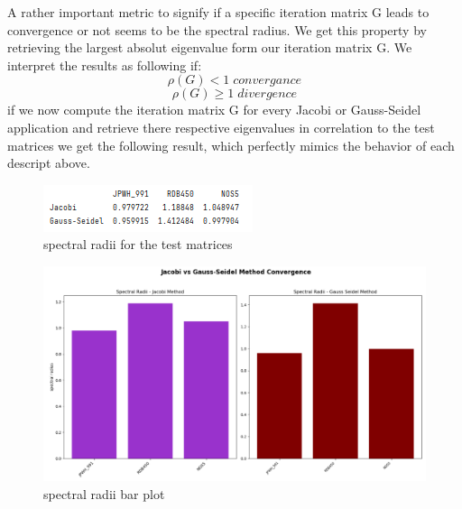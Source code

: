 \documentclass{article}
\begin{document}
A rather important metric to signify if a specific iteration matrix G leads to convergence or not seems to be the spectral radius. We get this property by retrieving the largest absolut eigenvalue form our iteration matrix G. We interpret the results as following if:\newline
$$\rho(G) < 1 \; convergance$$
$$\rho(G) \geq 1 \; divergence$$
if we now compute the iteration matrix G for every Jacobi or Gauss-Seidel application and retrieve there respective eigenvalues in correlation to the test matrices we get the following result, which perfectly mimics the behavior of each descript above. 
 \begin{figure}[h!]
     \centering
     \includegraphics[width=0.5\linewidth]{spec_radii_stats.PNG}
     \caption{spectral radii for the test matrices}
 \end{figure}
\begin{figure}
    \centering
    \includegraphics[width=1\linewidth]{spec_radii_bar_plot.PNG}
    \caption{spectral radii bar plot}
\end{figure}
\end{document}

